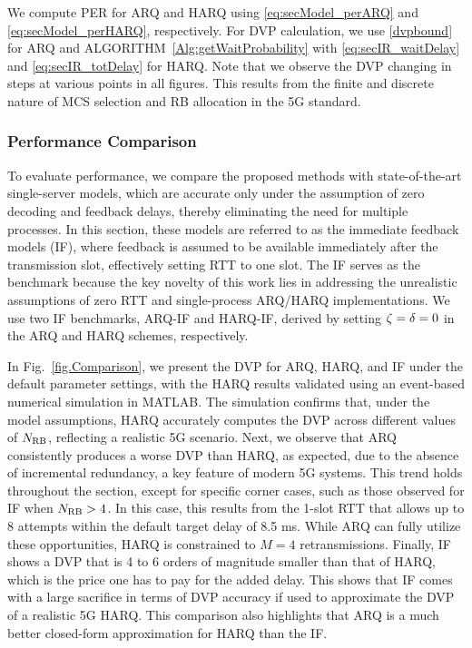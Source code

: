 We compute PER for ARQ and HARQ using \eqref{eq:secModel_perARQ} and \eqref{eq:secModel_perHARQ}, respectively. 
For DVP calculation, we use \eqref{dvpbound} for ARQ and ALGORITHM~\ref{Alg:getWaitProbability} with \eqref{eq:secIR_waitDelay} and \eqref{eq:secIR_totDelay} for HARQ. Note that we observe the DVP changing in steps at various points in all figures. This results from the finite and discrete nature of MCS selection and RB allocation in the 5G standard. 


\subsubsection*{Performance Comparison}
To evaluate performance, we compare the proposed methods with state-of-the-art single-server models, which are accurate only under the assumption of zero decoding and feedback delays, thereby eliminating the need for multiple processes. In this section, these models are referred to as the immediate feedback models (IF), where feedback is assumed to be available immediately after the transmission slot, effectively setting RTT to one slot.
The IF serves as the benchmark because the key novelty of this work lies in addressing the unrealistic assumptions of zero RTT and single-process ARQ/HARQ implementations.
We use two IF benchmarks, ARQ-IF and HARQ-IF, derived by setting ${\zeta} = \delta = 0$ in the ARQ and HARQ schemes, respectively.


In Fig.~\ref{fig.Comparison}, we present the DVP for ARQ, HARQ, and IF under the default parameter settings, with the HARQ results validated using an event-based numerical simulation in MATLAB. The simulation confirms that, under the model assumptions, HARQ accurately computes the DVP across different values of $N_{\mathrm{RB}}$, reflecting a realistic 5G scenario.
Next, we observe that ARQ consistently produces a worse DVP than HARQ, as expected, due to the absence of incremental redundancy, a key feature of modern 5G systems. This trend holds throughout the section, except for specific corner cases, such as those observed for IF when $N_{\mathrm{RB}}>4$. In this case, this results from the 1-slot RTT that allows up to 8 attempts within the default target delay of 8.5 ms. While ARQ can fully utilize these opportunities, HARQ is constrained to $M=4$ retransmissions.
Finally, IF shows a DVP that is 4 to 6 orders of magnitude smaller than that of HARQ, which is the price one has to pay for the added delay. This shows that IF comes with a large sacrifice in terms of DVP accuracy if used to approximate the DVP of a realistic 5G HARQ.
This comparison also highlights that ARQ is a much better closed-form approximation for HARQ than the IF.

